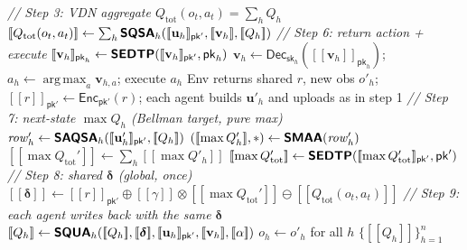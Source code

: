 \documentclass[letterpaper,10pt]{article}
\newcommand{\textbt}[1]{\textsf{\textbf{#1}}}
\theoremstyle{remark}
\newcommand{\En}[1]{[\![#1]\!]}
\newcommand{\Qtot}{Q_{\mathrm{tot}}}
\newcommand{\deltav}{\boldsymbol{\delta}}
\begin{document}
\begin{algorithm}[t]
\begin{algorithmic}[1]
  \EndFor
  \Statex \textit{// Step 3: VDN aggregate $\Qtot(o_t,a_t)=\sum_h Q_h$}
  \State $\En{\Qtot(o_t,a_t)} \gets
    \textstyle\sum_h \textbt{SQSA}_h(\En{\mathbf{u}_h}_{\mathsf{pk}'},
    \En{\mathbf{v}_h}, \En{Q_h})$
  \Statex \textit{// Step 6: return action + execute}
    \State $\En{\mathbf{v}_h}_{\mathsf{pk}_h} \gets
      \textbt{SEDTP}(\En{\mathbf{v}_h}_{\mathsf{pk}'}, \mathsf{pk}_h)$
    \State $\mathbf{v}_h \gets
      \mathsf{Dec}_{\mathsf{sk}_h}(\En{\mathbf{v}_h}_{\mathsf{pk}_h})$;
      $a_h \gets \operatorname*{arg\,max}_a \mathbf{v}_{h,a}$; execute $a_h$
  \EndFor
  \State Env returns shared $r$, new obs $o'_h$;
    $\En{r}_{\mathsf{pk}'}\gets\mathsf{Enc}_{\mathsf{pk}'}(r)$;
    each agent builds $\mathbf{u}'_h$ and uploads as in step 1
  \Statex \textit{// Step 7: next-state $\max Q_h$ (Bellman target, pure max)}
    \State $\mathit{row}'_h \gets \textbt{SAQSA}_h(\En{\mathbf{u}'_h}_{\mathsf{pk}'}, \En{Q_h})$
    \State $(\En{\max Q'_h}, *) \gets \textbt{SMAA}(\mathit{row}'_h)$
  \EndFor
  \State $\En{\max \Qtot'} \gets \textstyle\sum_h \En{\max Q'_h}$
  \State $\En{\max \Qtot'} \gets
    \textbt{SEDTP}(\En{\max \Qtot'}_{\mathsf{pk}'}, \mathsf{pk}')$
  \Statex \textit{// Step 8: shared $\deltav$ (global, once)}
  \State $\En{\deltav} \gets \En{r}_{\mathsf{pk}'} \oplus \En{\gamma}\otimes\En{\max \Qtot'}
    \ominus \En{\Qtot(o_t,a_t)}$
  \Statex \textit{// Step 9: each agent writes back with the same $\deltav$}
    \State $\En{Q_h} \gets \textbt{SQUA}_h(\En{Q_h}, \En{\deltav},
      \En{\mathbf{u}_h}_{\mathsf{pk}'}, \En{\mathbf{v}_h}, \En{\alpha})$
  \EndFor
  \State $o_h \gets o'_h$ for all $h$ 
\EndFor
\State \Return $\{\En{Q_h}\}_{h=1}^n$
\end{algorithmic}
\end{algorithm}
\end{document}
